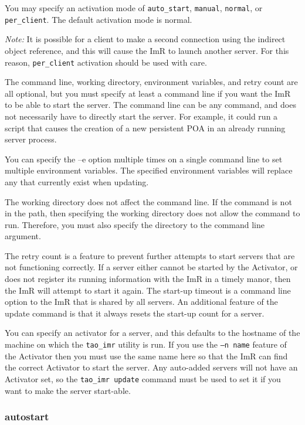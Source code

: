 You may specify an activation mode of {\tt auto\_start}, {\tt manual},
{\tt normal},  or {\tt per\_client}. The default activation mode is normal.

\emph {Note:} It is possible for a client to make a second connection
using the indirect object reference, and this will cause the ImR to launch
another server. For this reason, {\tt per\_client} activation should be used
with care.

The command line, working directory, environment variables, and retry
count are all optional, but you must specify at least a command line if
you want the ImR to be able to start the server. The command line can
be any command, and does not necessarily have to directly start the server.
For example, it could run a script that causes the creation of a new persistent
POA in an already running server process.

You can specify the –e option multiple times on a single command line to
set multiple environment variables. The specified environment variables
will replace any that currently exist when updating.

The working directory does not affect the command line. If the command
is not in the path, then specifying the working directory does not allow the
command to run. Therefore, you must also specify the directory to the
command line argument.

The retry count is a feature to prevent further attempts to start servers that
are not functioning correctly. If a server either cannot be started by the
Activator, or does not register its running information with the ImR in a timely
manor, then the ImR will attempt to start it again. The start-up timeout is a
command line option to the ImR that is shared by all servers. An additional
feature of the update command is that it always resets the start-up count for
a server.

You can specify an activator for a server, and this defaults to the hostname
of the machine on which the {\tt tao\_imr} utility is run. If you use the
{\tt –n name} feature of the Activator then you must use the same name
here so that the ImR can find the correct Activator to start the server.
Any auto-added servers will not have an Activator set, so the
{\tt tao\_imr update} command must be used to set it if you want to make
the server start-able.

\subsubsection{autostart}

